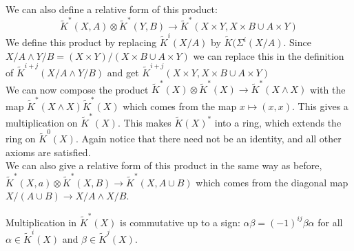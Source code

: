 \documentclass[../Thesis.tex]{subfiles}
\begin{document}
We can also define a relative form of this product:
$$\tilde{K}^*(X,A) \otimes \tilde{K}^*(Y,B) \rightarrow \tilde{K}^*(X \times Y, X \times B \cup A \times Y)$$
We define this product by replacing $\tilde{K}^i(X/A)$ by $\tilde{K}(\Sigma^i(X/A)$. Since $X/A \wedge Y/B = (X \times Y) / (X \times B \cup A \times Y)$ we can replace this in the definition of $\tilde{K}^{i + j}(X/A \wedge Y/B)$ and get $\tilde{K}^{i + j} (X \times Y, X \times B \cup A \times Y)$
\\We can now compose the product $\tilde{K}^*(X) \otimes \tilde{K}^*(X) \rightarrow \tilde{K}^*(X \wedge X)$ with the map $\tilde{K}^*(X \wedge X) \tilde{K}^*(X)$ which comes from the map $x \mapsto (x,x)$. This gives a multiplication on $\tilde{K}^*(X)$. This makes $\tilde{K}(X)^*$ into a ring, which extends the ring on $\tilde{K}^0(X)$. Again notice that there need not be an identity, and all other axioms are satisfied.
\\We can also give a relative form of this product in the same way as before, $\tilde{K}^*(X,a) \otimes \tilde{K}^*(X,B) \rightarrow \tilde{K}^*(X, A \cup B)$ which comes from the diagonal map $X/(A \cup B) \rightarrow X/A \wedge X/B$. 
\begin{prop}
Multiplication in $\tilde{K}^*(X)$ is commutative up to a sign: $\alpha \beta = (-1)^{ij} \beta \alpha$ for all $\alpha \in \tilde{K}^i(X)$ and $\beta \in \tilde{K}^j(X)$.
\end{prop}
\end{document}
